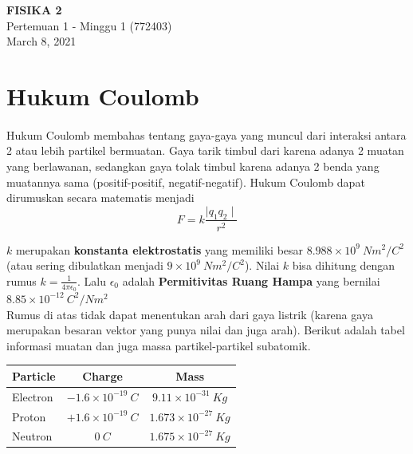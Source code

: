 \documentclass[twocolumn, 11pt]{article}%
\begin{document}
\begin{strip}
  \vspace*{\dimexpr-\stripsep}
  \begin{center}
      \Large\textbf{FISIKA 2}\\
      \large{Pertemuan 1 - Minggu 1 (772403)}\\
      \large{March 8, 2021}
   \end{center}
\end{strip}

\section{Hukum Coulomb}
        \paragraph{ } Hukum Coulomb membahas tentang gaya-gaya yang muncul dari interaksi antara 2 atau lebih partikel bermuatan. Gaya tarik timbul dari karena adanya 2 muatan yang berlawanan, sedangkan gaya tolak timbul karena adanya 2 benda yang muatannya sama (positif-positif, negatif-negatif). Hukum Coulomb dapat dirumuskan secara matematis menjadi
        \[F = k \frac{\mid q_1 q_2 \mid}{r^2} \]

        $k$ merupakan \textbf{konstanta elektrostatis} yang memiliki besar $8.988 \times 10^9\ Nm^2/C^2$ (atau sering dibulatkan menjadi $9 \times 10^9\ Nm^2/C^2$). Nilai $k$ bisa dihitung dengan rumus $\displaystyle k=\frac{1}{4\pi \epsilon_0}$. Lalu $\epsilon_0$ adalah \textbf{Permitivitas Ruang Hampa} yang bernilai $8.85 \times 10^{-12}\ C^2/Nm^2$\\

        Rumus di atas tidak dapat menentukan arah dari gaya listrik (karena gaya merupakan besaran vektor yang punya nilai dan juga arah). Berikut adalah tabel informasi muatan dan juga massa partikel-partikel subatomik.

        \begin{table}[h!]
            \begin{center}
                \begin{tabular}{l|c|c}
                    \textbf{Particle} & \textbf{Charge} & \textbf{Mass}\\
                    \hline
                    Electron & $-1.6 \times 10^{-19}\ C$ & $9.11 \times 10^{-31}\ Kg$\\
                    Proton & $+1.6 \times 10^{-19}\ C$ & $1.673 \times 10^{-27}\ Kg$\\
                    Neutron & $0\ C$ & $1.675 \times 10^{-27}\ Kg$
                \end{tabular}
            \end{center}
        \end{table}
\end{document}
